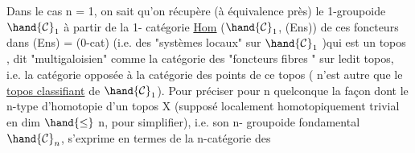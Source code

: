 Dans le cas n = 1,  on sait qu'on récupère (à équivalence près)   le
1-groupoide  $\hand{\mathcal{C}}_{1}$  à partir de la 1- catégorie  \uline{Hom} ($\hand{\mathcal{C}}_{1}$, (Ens))  de ces
foncteurs  dans (Ens) = (0-cat) (i.e. des "systèmes locaux" sur $\hand{\mathcal{C}}_{1}$ )\hand{(}qui est
un  topos , dit "multigaloisien"\hand{)}\deleted{\unsure{,}}  comme la catégorie des "foncteurs fibres "
sur ledit topos, i.e. la catégorie opposée à la catégorie des points de ce
topos ( n'est autre que le  \uline{topos classifiant}  de $\hand{\mathcal{C}}_{1}$). Pour préciser
pour n quelconque la façon dont le n-type d'homotopie d'un topos X (supposé
localement homotopiquement trivial en dim $\hand{\leq}$ n, pour simplifier), i.e.  son
n- groupoide fondamental $\hand{\mathcal{C}}_{n}$,  s'exprime en termes de la  n-catégorie des

